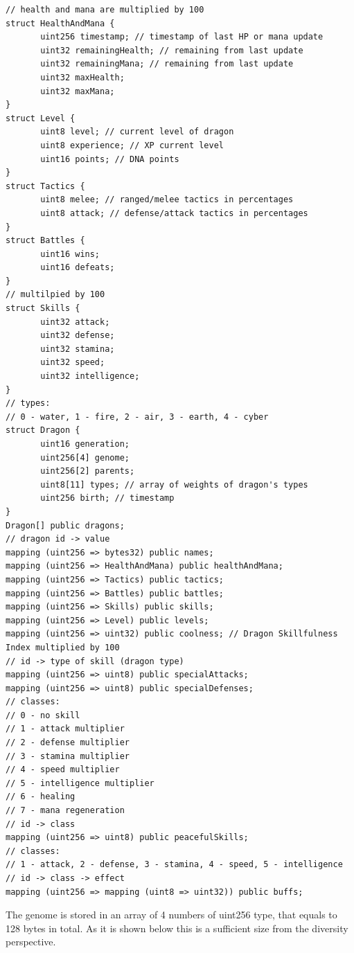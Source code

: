\documentclass[12pt]{article}
\begin{document}
\begin{footnotesize}
\begin{verbatim}
// health and mana are multiplied by 100
struct HealthAndMana {
       uint256 timestamp; // timestamp of last HP or mana update
       uint32 remainingHealth; // remaining from last update
       uint32 remainingMana; // remaining from last update
       uint32 maxHealth;
       uint32 maxMana;
}
struct Level {
       uint8 level; // current level of dragon
       uint8 experience; // XP current level
       uint16 points; // DNA points
}
struct Tactics {
       uint8 melee; // ranged/melee tactics in percentages
       uint8 attack; // defense/attack tactics in percentages
}
struct Battles {
       uint16 wins;
       uint16 defeats;
}
// multilpied by 100
struct Skills {
       uint32 attack;
       uint32 defense;
       uint32 stamina;
       uint32 speed;
       uint32 intelligence;
}
// types:
// 0 - water, 1 - fire, 2 - air, 3 - earth, 4 - cyber
struct Dragon {
       uint16 generation;
       uint256[4] genome;
       uint256[2] parents;
       uint8[11] types; // array of weights of dragon's types
       uint256 birth; // timestamp
}
Dragon[] public dragons;
// dragon id -> value
mapping (uint256 => bytes32) public names;
mapping (uint256 => HealthAndMana) public healthAndMana;
mapping (uint256 => Tactics) public tactics;
mapping (uint256 => Battles) public battles;
mapping (uint256 => Skills) public skills;
mapping (uint256 => Level) public levels;
mapping (uint256 => uint32) public coolness; // Dragon Skillfulness Index multiplied by 100
// id -> type of skill (dragon type)
mapping (uint256 => uint8) public specialAttacks;
mapping (uint256 => uint8) public specialDefenses;
// classes:
// 0 - no skill
// 1 - attack multiplier
// 2 - defense multiplier
// 3 - stamina multiplier
// 4 - speed multiplier
// 5 - intelligence multiplier
// 6 - healing
// 7 - mana regeneration
// id -> class
mapping (uint256 => uint8) public peacefulSkills;
// classes:
// 1 - attack, 2 - defense, 3 - stamina, 4 - speed, 5 - intelligence
// id -> class -> effect
mapping (uint256 => mapping (uint8 => uint32)) public buffs;

\end{verbatim}
\end{footnotesize}

The genome is stored in an array of 4 numbers of uint256 type, that equals to 128 bytes in total. As it is shown below this is a sufficient size from the diversity perspective.\par
\end{document}
